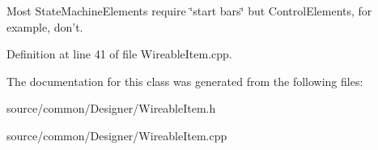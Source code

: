 Most State\-Machine\-Elements require \char`\"{}start bars\char`\"{} but Control\-Elements, for example, don't. 

Definition at line 41 of file Wireable\-Item.\-cpp.



The documentation for this class was generated from the following files\-:\begin{DoxyCompactItemize}
\item 
source/common/\-Designer/Wireable\-Item.\-h\item 
source/common/\-Designer/Wireable\-Item.\-cpp\end{DoxyCompactItemize}
